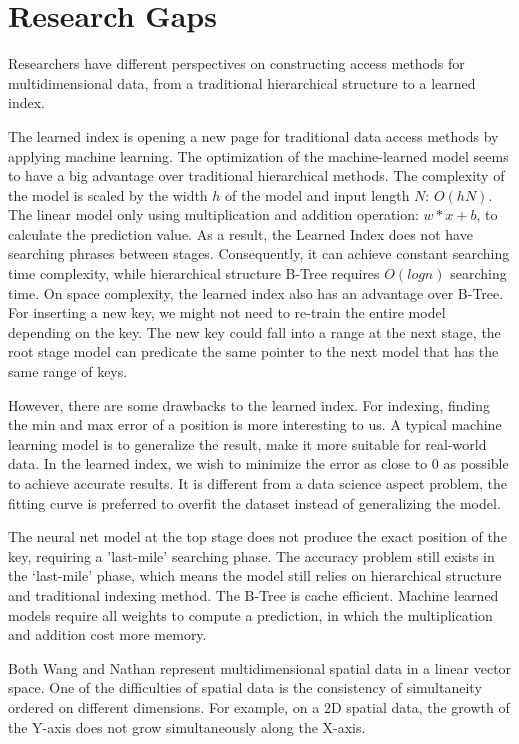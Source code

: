 \section{Research Gaps}
Researchers have different perspectives on constructing access methods for multidimensional data, from a traditional hierarchical structure to a learned index. 

The learned index is opening a new page for traditional data access methods by applying machine learning. The optimization of the machine-learned model seems to have a big advantage over traditional hierarchical methods. The complexity of the model is scaled by the width $h$ of the model and input length $N$: $O(hN)$. The linear model only using multiplication and addition operation: $w*x+b$, to calculate the prediction value. As a result, the Learned Index does not have searching phrases between stages. Consequently, it can achieve constant searching time complexity, while hierarchical structure B-Tree requires $O(logn)$ searching time. On space complexity, the learned index also has an advantage over B-Tree. For inserting a new key, we might not need to re-train the entire model depending on the key. The new key could fall into a range at the next stage, the root stage model can predicate the same pointer to the next model that has the same range of keys. 

However, there are some drawbacks to the learned index. For indexing, finding the min and max error of a position is more interesting to us. A typical machine learning model is to generalize the result, make it more suitable for real-world data. In the learned index, we wish to minimize the error as close to 0 as possible to achieve accurate results. It is different from a data science aspect problem, the fitting curve is preferred to overfit the dataset instead of generalizing the model. 

The neural net model at the top stage does not produce the exact position of the key, requiring a 'last-mile' searching phase. The accuracy problem still exists in the ‘last-mile’ phase, which means the model still relies on hierarchical structure and traditional indexing method. The B-Tree is cache efficient. Machine learned models require all weights to compute a prediction, in which the multiplication and addition cost more memory. 
 

Both Wang \cite{Wang:2019ks} and Nathan \cite{Nathan:2019wc} represent multidimensional spatial data in a linear vector space. One of the difficulties of spatial data is the consistency of simultaneity ordered on different dimensions. For example, on a 2D spatial data, the growth of the Y-axis does not grow simultaneously along the X-axis. 


